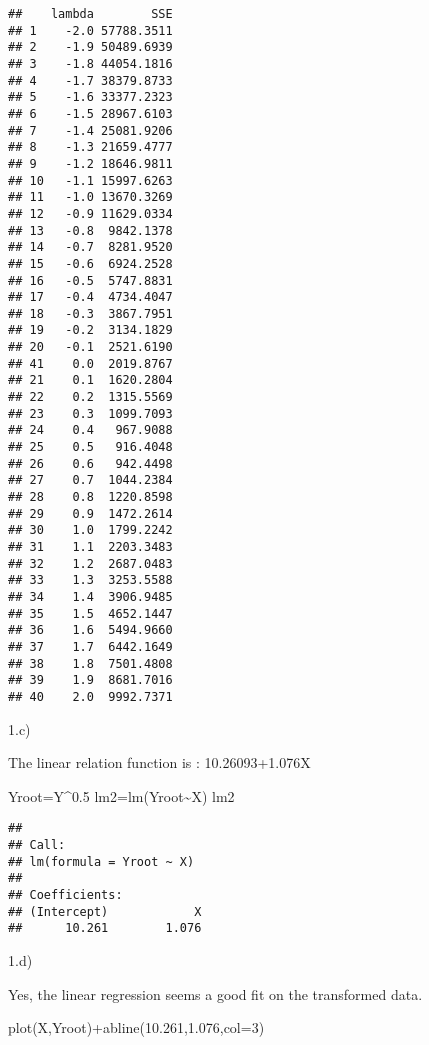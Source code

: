 \documentclass[
]{article}
\newenvironment{Shaded}{\begin{snugshade}}{\end{snugshade}}
\newcommand{\AttributeTok}[1]{\textcolor[rgb]{0.77,0.63,0.00}{#1}}
\newcommand{\DecValTok}[1]{\textcolor[rgb]{0.00,0.00,0.81}{#1}}
\newcommand{\FloatTok}[1]{\textcolor[rgb]{0.00,0.00,0.81}{#1}}
\newcommand{\FunctionTok}[1]{\textcolor[rgb]{0.00,0.00,0.00}{#1}}
\newcommand{\NormalTok}[1]{#1}
\newcommand{\OtherTok}[1]{\textcolor[rgb]{0.56,0.35,0.01}{#1}}
\newcommand{\SpecialCharTok}[1]{\textcolor[rgb]{0.00,0.00,0.00}{#1}}
\begin{document}
\begin{verbatim}
##    lambda        SSE
## 1    -2.0 57788.3511
## 2    -1.9 50489.6939
## 3    -1.8 44054.1816
## 4    -1.7 38379.8733
## 5    -1.6 33377.2323
## 6    -1.5 28967.6103
## 7    -1.4 25081.9206
## 8    -1.3 21659.4777
## 9    -1.2 18646.9811
## 10   -1.1 15997.6263
## 11   -1.0 13670.3269
## 12   -0.9 11629.0334
## 13   -0.8  9842.1378
## 14   -0.7  8281.9520
## 15   -0.6  6924.2528
## 16   -0.5  5747.8831
## 17   -0.4  4734.4047
## 18   -0.3  3867.7951
## 19   -0.2  3134.1829
## 20   -0.1  2521.6190
## 41    0.0  2019.8767
## 21    0.1  1620.2804
## 22    0.2  1315.5569
## 23    0.3  1099.7093
## 24    0.4   967.9088
## 25    0.5   916.4048
## 26    0.6   942.4498
## 27    0.7  1044.2384
## 28    0.8  1220.8598
## 29    0.9  1472.2614
## 30    1.0  1799.2242
## 31    1.1  2203.3483
## 32    1.2  2687.0483
## 33    1.3  3253.5588
## 34    1.4  3906.9485
## 35    1.5  4652.1447
## 36    1.6  5494.9660
## 37    1.7  6442.1649
## 38    1.8  7501.4808
## 39    1.9  8681.7016
## 40    2.0  9992.7371
\end{verbatim}

1.c)

The linear relation function is : 10.26093+1.076X

\begin{Shaded}
\begin{Highlighting}[]
\NormalTok{Yroot}\OtherTok{=}\NormalTok{Y}\SpecialCharTok{\^{}}\FloatTok{0.5}
\NormalTok{lm2}\OtherTok{=}\FunctionTok{lm}\NormalTok{(Yroot}\SpecialCharTok{\textasciitilde{}}\NormalTok{X)}
\NormalTok{lm2}
\end{Highlighting}
\end{Shaded}

\begin{verbatim}
## 
## Call:
## lm(formula = Yroot ~ X)
## 
## Coefficients:
## (Intercept)            X  
##      10.261        1.076
\end{verbatim}

1.d)

Yes, the linear regression seems a good fit on the transformed data.

\begin{Shaded}
\begin{Highlighting}[]
\FunctionTok{plot}\NormalTok{(X,Yroot)}\SpecialCharTok{+}\FunctionTok{abline}\NormalTok{(}\FloatTok{10.261}\NormalTok{,}\FloatTok{1.076}\NormalTok{,}\AttributeTok{col=}\DecValTok{3}\NormalTok{)}
\end{Highlighting}
\end{Shaded}
\end{document}
